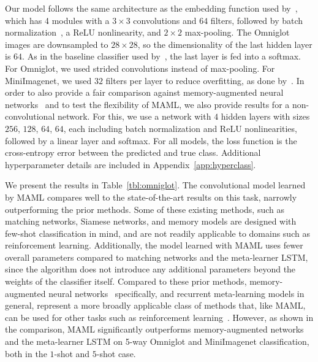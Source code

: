 \documentclass{article}
\begin{document}
Our model follows the same architecture as the embedding function used by~\citet{matchingnets}, which has 4 modules with a $3\times3$ convolutions and $64$ filters, followed by batch normalization~\cite{batchnorm}, a ReLU nonlinearity, and $2\times2$ max-pooling. The Omniglot images are downsampled to $28\times28$, so the dimensionality of the last hidden layer is $64$. As in the baseline classifier used by~\citet{matchingnets}, the last layer is fed into a softmax. For Omniglot, we used strided convolutions instead of max-pooling. For MiniImagenet, we used $32$ filters per layer to reduce overfitting, as done by~\cite{hugo}. 
In order to also provide a fair comparison against memory-augmented neural networks~\cite{mann} and to test the flexibility of MAML, we also provide results for a non-convolutional network. For this, we use a network with $4$ hidden layers with sizes $256$, $128$, $64$, $64$, each including batch normalization and ReLU nonlinearities, followed by a linear layer and softmax. For all models, the loss function is the cross-entropy error between the predicted and true class. Additional hyperparameter details are included in Appendix~\ref{app:hyperclass}.


We present the results in Table~\ref{tbl:omniglot}. The convolutional model learned by MAML compares well to the state-of-the-art results on this task, narrowly outperforming the prior methods. Some of these existing methods, such as matching networks, Siamese networks, and memory models are designed with few-shot classification in mind, and are not readily applicable to domains such as reinforcement learning. Additionally, the model learned with MAML uses fewer overall parameters compared to matching networks and the meta-learner LSTM, since the algorithm does not introduce any additional parameters beyond the weights of the classifier itself. Compared to these prior methods, memory-augmented neural networks~\cite{mann} specifically, and recurrent meta-learning models in general, represent a more broadly applicable class of methods that, like MAML, can be used for other tasks such as reinforcement learning~\cite{rl2,learningrl}. However, as shown in the comparison, MAML significantly outperforms memory-augmented networks and the meta-learner LSTM on 5-way Omniglot and MiniImagenet classification, both in the $1$-shot and $5$-shot case.
\end{document}
